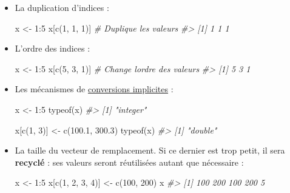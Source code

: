 \documentclass[
  french,
]{scrbook}
\newenvironment{Shaded}{\begin{snugshade}}{\end{snugshade}}
\newcommand{\CommentTok}[1]{\textcolor[rgb]{0.56,0.35,0.01}{\textit{#1}}}
\newcommand{\DecValTok}[1]{\textcolor[rgb]{0.00,0.00,0.81}{#1}}
\newcommand{\FloatTok}[1]{\textcolor[rgb]{0.00,0.00,0.81}{#1}}
\newcommand{\FunctionTok}[1]{\textcolor[rgb]{0.00,0.00,0.00}{#1}}
\newcommand{\NormalTok}[1]{#1}
\newcommand{\OtherTok}[1]{\textcolor[rgb]{0.56,0.35,0.01}{#1}}
\newcommand{\SpecialCharTok}[1]{\textcolor[rgb]{0.00,0.00,0.00}{#1}}
\begin{document}
\begin{itemize}
\item
  La duplication d'indices :

\begin{Shaded}
\begin{Highlighting}[]
\NormalTok{x }\OtherTok{\textless{}{-}} \DecValTok{1}\SpecialCharTok{:}\DecValTok{5}
\NormalTok{x[}\FunctionTok{c}\NormalTok{(}\DecValTok{1}\NormalTok{, }\DecValTok{1}\NormalTok{, }\DecValTok{1}\NormalTok{)] }\CommentTok{\# Duplique les valeurs}
\CommentTok{\#\textgreater{} [1] 1 1 1}
\end{Highlighting}
\end{Shaded}
\item
  L'ordre des indices :

\begin{Shaded}
\begin{Highlighting}[]
\NormalTok{x }\OtherTok{\textless{}{-}} \DecValTok{1}\SpecialCharTok{:}\DecValTok{5}
\NormalTok{x[}\FunctionTok{c}\NormalTok{(}\DecValTok{5}\NormalTok{, }\DecValTok{3}\NormalTok{, }\DecValTok{1}\NormalTok{)] }\CommentTok{\# Change l\textquotesingle{}ordre des valeurs}
\CommentTok{\#\textgreater{} [1] 5 3 1}
\end{Highlighting}
\end{Shaded}
\item
  Les mécanismes de \protect\hyperlink{conversion}{conversions implicites} :

\begin{Shaded}
\begin{Highlighting}[]
\NormalTok{x }\OtherTok{\textless{}{-}} \DecValTok{1}\SpecialCharTok{:}\DecValTok{5}
\FunctionTok{typeof}\NormalTok{(x)}
\CommentTok{\#\textgreater{} [1] "integer"}

\NormalTok{x[}\FunctionTok{c}\NormalTok{(}\DecValTok{1}\NormalTok{, }\DecValTok{3}\NormalTok{)] }\OtherTok{\textless{}{-}} \FunctionTok{c}\NormalTok{(}\FloatTok{100.1}\NormalTok{, }\FloatTok{300.3}\NormalTok{)}
\FunctionTok{typeof}\NormalTok{(x)}
\CommentTok{\#\textgreater{} [1] "double"}
\end{Highlighting}
\end{Shaded}
\item
  La taille du vecteur de remplacement. Si ce dernier est trop petit, il sera \textbf{recyclé} : ses valeurs seront réutilisées autant que nécessaire :

\begin{Shaded}
\begin{Highlighting}[]
\NormalTok{x }\OtherTok{\textless{}{-}} \DecValTok{1}\SpecialCharTok{:}\DecValTok{5}
\NormalTok{x[}\FunctionTok{c}\NormalTok{(}\DecValTok{1}\NormalTok{, }\DecValTok{2}\NormalTok{, }\DecValTok{3}\NormalTok{, }\DecValTok{4}\NormalTok{)] }\OtherTok{\textless{}{-}} \FunctionTok{c}\NormalTok{(}\DecValTok{100}\NormalTok{, }\DecValTok{200}\NormalTok{)}
\NormalTok{x}
\CommentTok{\#\textgreater{} [1] 100 200 100 200   5}
\end{Highlighting}
\end{Shaded}
\end{itemize}
\end{document}
